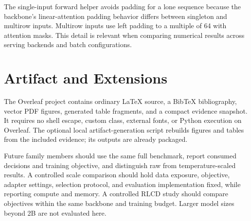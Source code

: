 The single-input forward helper avoids padding for a lone sequence because the backbone's linear-attention padding behavior differs between singleton and multirow inputs. Multirow inputs use left padding to a multiple of 64 with attention masks. This detail is relevant when comparing numerical results across serving backends and batch configurations.

\balance
\section{Artifact and Extensions}
\label{app:artifact}
The Overleaf project contains ordinary LaTeX source, a BibTeX bibliography, vector PDF figures, generated table fragments, and a compact evidence snapshot. It requires no shell escape, custom class, external fonts, or Python execution on Overleaf. The optional local artifact-generation script rebuilds figures and tables from the included evidence; its outputs are already packaged.

Future family members should use the same full benchmark, report consumed decisions and training objective, and distinguish raw from temperature-scaled results. A controlled scale comparison should hold data exposure, objective, adapter settings, selection protocol, and evaluation implementation fixed, while reporting compute and memory. A controlled RLCD study should compare objectives within the same backbone and training budget. Larger model sizes beyond 2B are not evaluated here.
